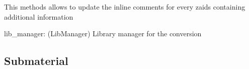 \documentclass[letterpaper,10pt,english]{sphinxmanual}
\begin{document}
\begin{fulllineitems}
\begin{fulllineitems}
\begin{quote}
\begin{description}
\end{description}\end{quote}

\end{fulllineitems}


\begin{fulllineitems}
\label{\detokenize{api/inputgeneration:matreader.Material.update_info}}
\sphinxAtStartPar
This methods allows to update the in\sphinxhyphen{}line comments for every zaids
containing additional information

\sphinxAtStartPar
lib\_manager: (LibManager) Library manager for the conversion

\end{fulllineitems}


\end{fulllineitems}



\subsection{Submaterial}
\label{\detokenize{api/inputgeneration:submaterial}}
\end{document}
